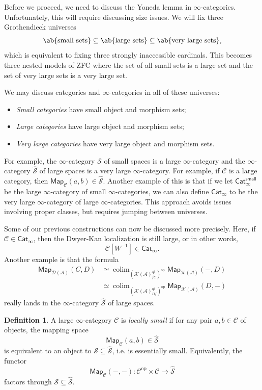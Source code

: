 \documentclass[10pt, oneside]{memoir}
\theoremstyle{definition}
\newtheorem{defn}[thm]{Definition}
\theoremstyle{remark}
\theoremstyle{plain}
\theoremstyle{definition}
\theoremstyle{remark}
\newcommand{\mc}[1]{\mathcal{#1}}
\newcommand{\ms}[1]{\mathsf{#1}}
\newcommand{\1}{\mathbf{1}}
\newcommand{\2}{\mathbf{2}}
\newcommand{\3}{\mathbf{3}}
\DeclareMathOperator{\op}{op}
\DeclareMathOperator*{\colim}{colim}
\begin{document}
Before we proceed, we need to discuss the Yoneda lemma in \(\infty \)-categories. Unfortunately, this will require discussing size issues. We will fix three Grothendieck universes
\[ \ab\{ \text{small sets}\} \subseteq \ab\{ \text{large sets} \} \subseteq \ab\{ \text{very large sets} \}, \]
which is equivalent to fixing three strongly inaccessible cardinals. This becomes three nested models of ZFC where the set of all small sets is a large set and the set of very large sets is a very large set.

We may discuss categories and \(\infty \)-categories in all of these universes:
\begin{itemize}
    \item \textit{Small categories} have small object and morphism sets;
    \item \textit{Large categories} have large object and morphism sets;
    \item \textit{Very large categories} have very large object and morphism sets.
\end{itemize}
For example, the \(\infty \)-category \(\mc{S} \) of small spaces is a large \(\infty \)-category and the \(\infty \)-category \(\hat{\mc{S}} \) of large spaces is a very large \(\infty \)-category. For example, if \(\mc{C} \) is a large category, then \(\ms{Map}_{\mc{C}}(a,b) \in \hat{\mc{S}} \). Another example of this is that if we let \(\ms{Cat}_{\infty}^{\ms{small}} \) be the large \(\infty \)-category of small \(\infty \)-categories, we can also define \(\ms{Cat}_{\infty} \) to be the very large \(\infty \)-category of large \(\infty \)-categories. This approach avoids issues involving proper classes, but requires jumping between universes.

Some of our previous constructions can now be discussed more precisely. Here, if \(\mc{C} \in \ms{Cat}_{\infty} \), then the Dwyer-Kan localization is still large, or in other words,
\[ \mc{C}[W^{-1}] \in \ms{Cat}_{\infty}. \]
Another example is that the formula
\begin{align*}
    \ms{Map}_{\mc{D}(\mc{A})}(C, D) &\simeq \colim_{(\mc{K}(\mc{A})_{/C}^{\ms{qi}})^{\op}} \ms{Map}_{\mc{K}(\mc{A})}(-, D) \\
    &\simeq \colim_{(\mc{K}(\mc{A})_{D/}^{\ms{qi}})^{\op}} \ms{Map}_{\mc{K}(\mc{A})}(D, -)
\end{align*}
really lands in the \(\infty \)-category \(\hat{\mc{S}} \) of large spaces.

\begin{defn}
    A large \(\infty \)-category \(\mc{C} \) is \textit{locally small} if for any pair \(a,b \in \mc{C} \) of objects, the mapping space
    \[ \ms{Map}_{\mc{C}}(a,b) \in \hat{\mc{S}} \]
    is equivalent to an object to \(\mc{S} \subseteq \hat{\mc{S}} \), i.e. is essentially small. Equivalently, the functor
    \[ \ms{Map}_{\mc{C}}(-,-) \colon \mc{C}^{\op} \times \mc{C} \to \hat{\mc{S}} \]
    factors through \(\mc{S} \subseteq \hat{\mc{S}} \).
\end{defn}
\end{document}
